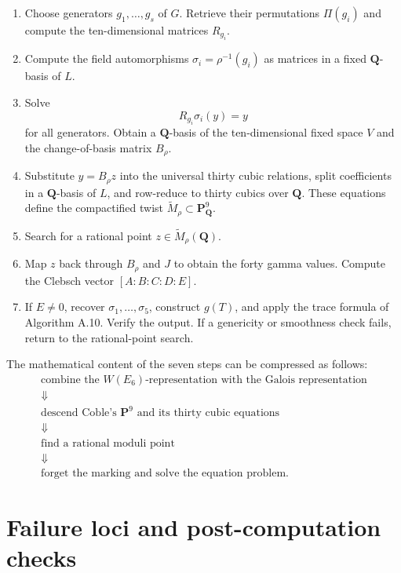 \documentclass[11pt]{article}
\newcommand{\QQ}{\mathbf{Q}}
\newcommand{\PP}{\mathbf{P}}
\newcommand{\tM}{\widetilde{M}}
\begin{document}
\begin{enumerate}[label=\textbf{Step \arabic*.}]
\item Choose generators $g_1,\ldots,g_s$ of $G$.  Retrieve their permutations
$\Pi(g_i)$ and compute the ten-dimensional matrices $R_{g_i}$.

\item Compute the field automorphisms
$\sigma_i=\rho^{-1}(g_i)$ as matrices in a fixed $\QQ$-basis of $L$.

\item Solve
\[
  R_{g_i}\sigma_i(y)=y
\]
for all generators.  Obtain a $\QQ$-basis of the ten-dimensional fixed space
$V$ and the change-of-basis matrix $B_{\rho}$.

\item Substitute $y=B_{\rho}z$ into the universal thirty cubic relations,
split coefficients in a $\QQ$-basis of $L$, and row-reduce to thirty cubics
over $\QQ$.  These equations define the compactified twist
$\tM_{\rho}\subset\PP^9_{\QQ}$.

\item Search for a rational point $z\in\tM_{\rho}(\QQ)$.

\item Map $z$ back through $B_{\rho}$ and $J$ to obtain the forty gamma
values.  Compute the Clebsch vector $[A:B:C:D:E]$.

\item If $E\neq0$, recover $\sigma_1,\ldots,\sigma_5$, construct $g(T)$,
and apply the trace formula of Algorithm A.10.  Verify the output.  If a
genericity or smoothness check fails, return to the rational-point search.
\end{enumerate}

The mathematical content of the seven steps can be compressed as follows:
\[
\boxed{
\begin{array}{c}
\text{combine the }W(E_6)\text{-representation with the Galois representation}\\
\Downarrow\\
\text{descend Coble's }\PP^9\text{ and its thirty cubic equations}\\
\Downarrow\\
\text{find a rational moduli point}\\
\Downarrow\\
\text{forget the marking and solve the equation problem.}
\end{array}}
\]

\section{Failure loci and post-computation checks}
\end{document}
